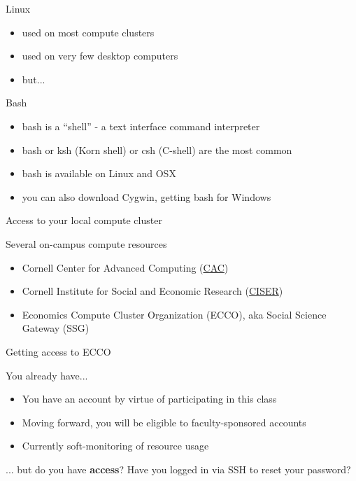 \documentclass[xcolor=table,compress]{beamer}
\begin{document}
\begin{frame}
\begin{block}{Linux}
\begin{itemize}
\item used on most compute clusters
\item used on very few desktop computers
\item but...
\end{itemize}
\end{block}
\pause
\begin{block}{Bash}
\begin{itemize}
\item bash is a ``shell'' - a text interface command interpreter
\item bash or ksh (Korn shell) or csh (C-shell) are the most common
\item bash is available on Linux and \pause OSX
\item you can also download Cygwin, getting bash for Windows
\end{itemize}
\end{block}
\end{frame}

\begin{frame}{Access to your local compute cluster}
\begin{block}{Several on-campus compute resources}
\begin{itemize}[<+->]
\item Cornell Center for Advanced Computing (\href{http://www.cac.cornell.edu}{CAC})\newline 
{}
\item Cornell Institute for Social and Economic Research 
(\href{http://www.ciser.cornell.edu}{CISER})
\pause
\item Economics Compute Cluster Organization (ECCO), aka Social Science Gateway (SSG)
\end{itemize}
\end{block}
\end{frame}


\begin{frame}{Getting access to ECCO}
\begin{block}{You already have...}
\begin{itemize}
\item You have an account by virtue of participating in this class
\item Moving forward, you will be eligible to faculty-sponsored accounts
\item Currently soft-monitoring of resource usage
\end{itemize}
\end{block}
\pause
\begin{block}{... but do you have \textbf{access}?}
Have you logged in via SSH to reset your password? \newline {}
\end{block}
\end{frame}
\end{document}
